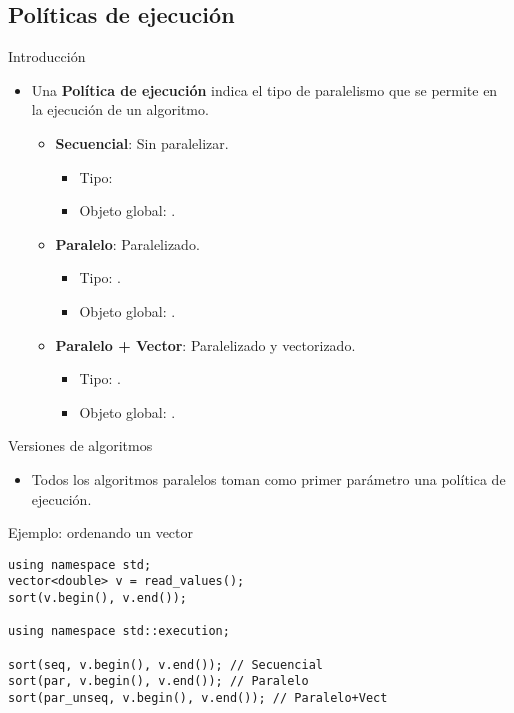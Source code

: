 \subsection{Políticas de ejecución}

\begin{frame}[t]{Introducción}
\begin{itemize}
  \item Una \textbf{Política de ejecución} indica el tipo de paralelismo
        que se permite en la ejecución de un algoritmo.
    \begin{itemize}
      \item \textbf{Secuencial}: Sin paralelizar.
        \begin{itemize}
          \item Tipo: 
          \item Objeto global: .
        \end{itemize}
      \item \textbf{Paralelo}: Paralelizado.
        \begin{itemize}
          \item Tipo: .
          \item Objeto global: .
        \end{itemize}
      \item \textbf{Paralelo + Vector}: Paralelizado y vectorizado.
        \begin{itemize}
          \item Tipo: .
          \item Objeto global: .
        \end{itemize}
    \end{itemize}
\end{itemize}
\end{frame}

\begin{frame}[t,fragile]{Versiones de algoritmos}
\begin{itemize}
  \item Todos los algoritmos paralelos toman como primer parámetro una política
        de ejecución.
\end{itemize}
\begin{block}{Ejemplo: ordenando un vector}
\begin{lstlisting}
using namespace std;
vector<double> v = read_values();
sort(v.begin(), v.end());

using namespace std::execution;

sort(seq, v.begin(), v.end()); // Secuencial
sort(par, v.begin(), v.end()); // Paralelo
sort(par_unseq, v.begin(), v.end()); // Paralelo+Vect
\end{lstlisting}
\end{block}
\end{frame}

